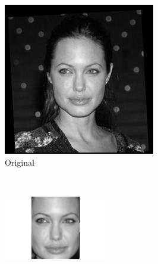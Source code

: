 \documentclass{llncs}
\begin{document}
\begin{figure}[t]
        \centering
        \begin{subfigure}[b]{0.2\textwidth}
                \centering
                \includegraphics[width=\textwidth]{angelina/Angelina_Jolie_0006_original}
                \caption{Original}
                \label{fig:original-original} 
        \end{subfigure}%
        ~ ~
        \begin{subfigure}[b]{0.2\textwidth}
                \centering
                \includegraphics[width=\textwidth]{angelina/Angelina_Jolie_0006_cropped}

\end{subfigure}
\end{figure}
\end{document}
